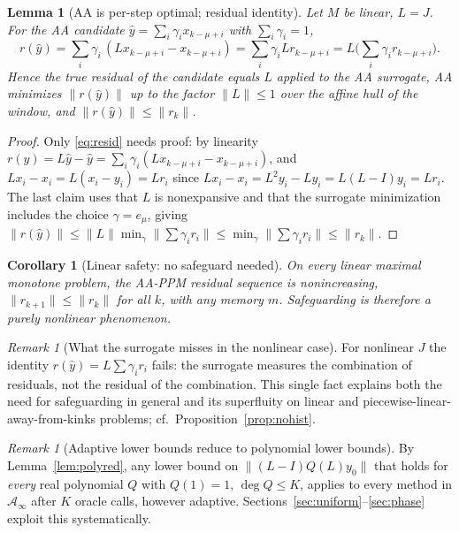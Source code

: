\documentclass[11pt]{article}
\newtheorem{lemma}[theorem]{Lemma}
\newtheorem{corollary}[theorem]{Corollary}
\theoremstyle{definition}
\theoremstyle{remark}
\newtheorem{remark}[theorem]{Remark}
\newcommand{\Aa}{\mathcal{A}}
\newcommand{\norm}[1]{\| #1 \|}
\begin{document}
\begin{lemma}[AA is per-step optimal; residual identity]\label{lem:perstep}
Let $M$ be linear, $L=J$. For the AA candidate
$\hat y=\sum_i\gamma_i x_{k-\mu+i}$ with $\sum_i\gamma_i=1$,
\begin{equation}\label{eq:resid}
r(\hat y)=\sum_i\gamma_i\,(Lx_{k-\mu+i}-x_{k-\mu+i})
=\sum_i\gamma_i L r_{k-\mu+i}=L\Big(\sum_i\gamma_i r_{k-\mu+i}\Big).
\end{equation}
Hence the true residual of the candidate equals $L$ applied to the AA
surrogate, AA minimizes $\norm{r(\hat y)}$ up to the factor $\norm{L}\le1$
over the affine hull of the window, and
$\norm{r(\hat y)}\le\norm{r_k}$.
\end{lemma}
\begin{proof}
Only \eqref{eq:resid} needs proof: by linearity
$r(\hat y)=L\hat y-\hat y=\sum_i\gamma_i(Lx_{k-\mu+i}-x_{k-\mu+i})$, and
$Lx_i-x_i=L(x_i-y_i)=Lr_i$ since $Lx_i-x_i=L^2y_i-Ly_i=L(L-I)y_i=Lr_i$.
The last claim uses that $L$ is nonexpansive and that the surrogate
minimization includes the choice $\gamma=e_{\mu}$, giving
$\norm{r(\hat y)}\le\norm{L}\min_\gamma\norm{\sum\gamma_i r_i}
\le\min_\gamma\norm{\sum\gamma_i r_i}\le\norm{r_k}$.
\end{proof}

\begin{corollary}[Linear safety: no safeguard needed]\label{cor:linsafe}
On every linear maximal monotone problem, the AA-PPM residual sequence is
nonincreasing, $\norm{r_{k+1}}\le\norm{r_k}$ for all $k$, with any memory
$m$. Safeguarding is therefore a purely \emph{nonlinear} phenomenon.
\end{corollary}

\begin{remark}[What the surrogate misses in the nonlinear case]\label{rem:nonlin}
For nonlinear $J$ the identity $r(\hat y)=L\sum\gamma_i r_i$ fails: the
surrogate measures the combination of residuals, not the residual of the
combination. This single fact explains both the need for safeguarding in
general and its superfluity on linear and piecewise-linear-away-from-kinks
problems; cf.\ Proposition~\ref{prop:nohist}.
\end{remark}

\begin{remark}[Adaptive lower bounds reduce to polynomial lower bounds]
\label{rem:reduction}
By Lemma~\ref{lem:polyred}, any lower bound on
$\norm{(L-I)Q(L)y_0}$ that holds for \emph{every} real polynomial $Q$ with
$Q(1)=1$, $\deg Q\le K$, applies to every method in $\Aa_\infty$ after $K$
oracle calls, however adaptive. Sections~\ref{sec:uniform}--\ref{sec:phase}
exploit this systematically.
\end{remark}
\end{document}

